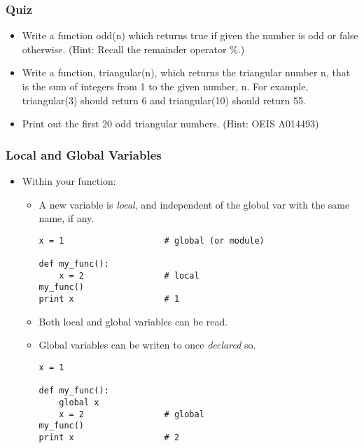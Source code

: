 \documentclass{beamer}
\begin{document}
\begin{frame}[fragile]
\frametitle{Quiz}
\begin{itemize}
\item Write a function odd(n) which returns true if given the
    number is odd or false otherwise. (Hint: Recall the remainder
    operator \%.)
\item Write a function, triangular(n), which returns the 
    triangular number n, that is the sum of integers from
    1 to the given number, n. For example, triangular(3)
    should return 6 and triangular(10) should return 55.
\item Print out the first 20 odd triangular numbers.
    (Hint: OEIS A014493)
\end{itemize}
\end{frame}

\begin{frame}[fragile]
\frametitle{Local and Global Variables}
\begin{itemize}
\item Within your function:
\begin{itemize}
\item A new variable 
      is \emph{local}, and independent of the global
      var with the same name, if any.
\begin{lstlisting}
x = 1                    # global (or module)

def my_func():
    x = 2                # local 
my_func()                
print x                  # 1
\end{lstlisting}
\item Both local and global variables can be read.
\item Global variables can be writen to once \emph{declared} so.
\begin{lstlisting}
x = 1                    

def my_func():
    global x
    x = 2                # global 
my_func()                
print x                  # 2
\end{lstlisting}
\end{itemize}
\end{itemize}
\end{frame}
\end{document}
